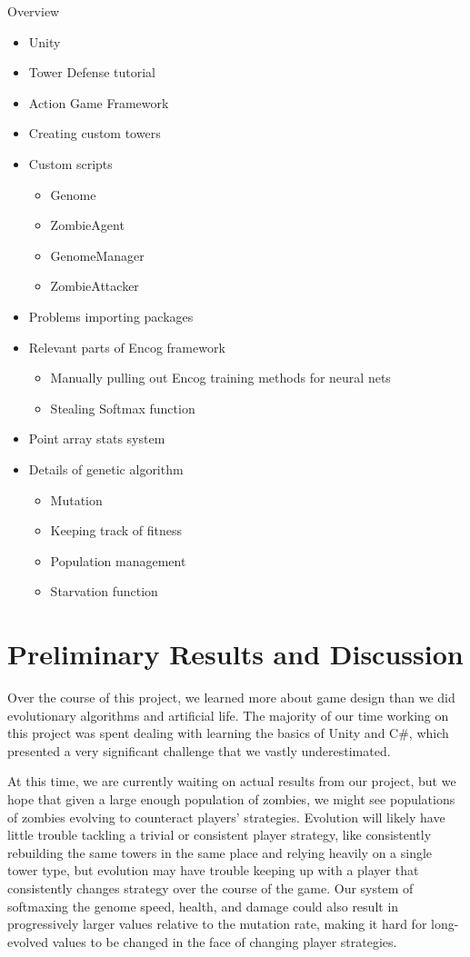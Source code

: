 \documentclass[letterpaper]{article}
\begin{document}
Overview
\begin{itemize}
    \item Unity
    \item Tower Defense tutorial
    \item Action Game Framework
    \item Creating custom towers
    \item Custom scripts
        \begin{itemize}
            \item Genome
            \item ZombieAgent
            \item GenomeManager
            \item ZombieAttacker
        \end{itemize}
    \item Problems importing packages
    \item Relevant parts of Encog framework
        \begin{itemize}
            \item Manually pulling out Encog training methods for neural nets
            \item Stealing Softmax function
        \end{itemize}
    \item Point array stats system
    \item Details of genetic algorithm
        \begin{itemize}
            \item Mutation
            \item Keeping track of fitness
            \item Population management
            \item Starvation function
        \end{itemize}
\end{itemize}


\section{Preliminary Results and Discussion}
Over the course of this project, we learned more about game design than we did
evolutionary algorithms and artificial life. The majority of our time working on
this project was spent dealing with learning the basics of Unity and C\#, which
presented a very significant challenge that we vastly underestimated.

At this time, we are currently waiting on actual results from our project, but
we hope that given a large enough population of zombies, we might see
populations of zombies evolving to counteract players' strategies. Evolution
will likely have little trouble tackling a trivial or consistent player
strategy, like consistently rebuilding the same towers in the same place and
relying heavily on a single tower type, but evolution may have trouble keeping
up with a player that consistently changes strategy over the course of the game.
Our system of softmaxing the genome speed, health, and damage could also
result in progressively larger values relative to the mutation rate, making it
hard for long-evolved values to be changed in the face of changing player
strategies.
\end{document}
